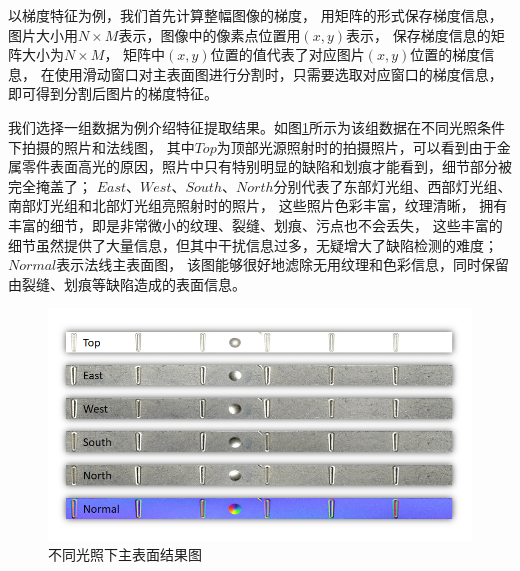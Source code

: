 以梯度特征为例，我们首先计算整幅图像的梯度，
用矩阵的形式保存梯度信息，
图片大小用$N\times M$表示，图像中的像素点位置用$(x,y)$表示，
保存梯度信息的矩阵大小为$N\times M$，
矩阵中$(x,y)$位置的值代表了对应图片$(x,y)$位置的梯度信息，
在使用滑动窗口对主表面图进行分割时，只需要选取对应窗口的梯度信息，
即可得到分割后图片的梯度特征。

我们选择一组数据为例介绍特征提取结果。如图\ref{fig:butogndengguangzhankaitu}所示为该组数据在不同光照条件下拍摄的照片和法线图，
其中$Top$为顶部光源照射时的拍摄照片，可以看到由于金属零件表面高光的原因，照片中只有特别明显的缺陷和划痕才能看到，细节部分被完全掩盖了；
$East$、$West$、$South$、$North$分别代表了东部灯光组、西部灯光组、南部灯光组和北部灯光组亮照射时的照片，
这些照片色彩丰富，纹理清晰，
拥有丰富的细节，即是非常微小的纹理、裂缝、划痕、污点也不会丢失，
这些丰富的细节虽然提供了大量信息，但其中干扰信息过多，无疑增大了缺陷检测的难度；
$Normal$表示法线主表面图，
该图能够很好地滤除无用纹理和色彩信息，同时保留由裂缝、划痕等缺陷造成的表面信息。

\begin{figure}[htbp]
\centering
\includegraphics[width=1.0\linewidth]{figures/butongdengguangzhankaitu.png}
\caption{不同光照下主表面结果图}
\label{fig:butogndengguangzhankaitu}
\end{figure}


